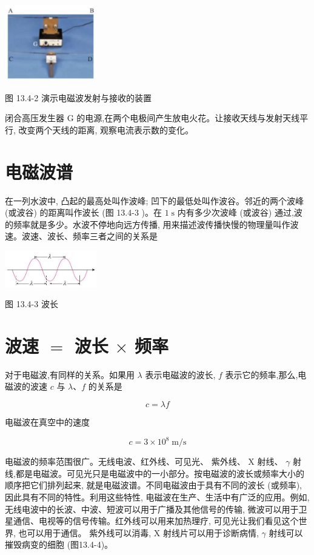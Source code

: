 \documentclass[10pt]{article}
\begin{document}
\begin{center}
\includegraphics[max width=0.3\textwidth]{images/01911d5f-8e38-70c0-b5b8-2b399bd115b6_125_777993.jpg}
\end{center}

图 13.4-2 演示电磁波发射与接收的装置

闭合高压发生器 \(\mathrm{G}\) 的电源,在两个电极间产生放电火花。让接收天线与发射天线平行, 改变两个天线的距离, 观察电流表示数的变化。

\section*{电磁波谱}

在一列水波中, 凸起的最高处叫作波峰; 凹下的最低处叫作波谷。邻近的两个波峰 (或波谷) 的距离叫作波长 (图 13.4-3 )。在 \(1\mathrm{\;s}\) 内有多少次波峰 (或波谷) 通过,波的频率就是多少。水波不停地向远方传播, 用来描述波传播快慢的物理量叫作波速。波速、波长、频率三者之间的关系是

\begin{center}
\includegraphics[max width=0.3\textwidth]{images/01911d5f-8e38-70c0-b5b8-2b399bd115b6_126_530533.jpg}
\end{center}

图 13.4-3 波长

\section*{波速 \(=\) 波长 \(\times\) 频率}

对于电磁波,有同样的关系。如果用 \(\lambda\) 表示电磁波的波长, \(f\) 表示它的频率,那么,电磁波的波速 \(c\) 与 \(\lambda \text{、}f\) 的关系是

\[
c = {\lambda f}
\]

电磁波在真空中的速度

\[
c = 3 \times {10}^{8}\mathrm{\;m}/\mathrm{s}
\]

电磁波的频率范围很广。无线电波、红外线、可见光、 紫外线、 \(\mathrm{X}\) 射线、 \(\gamma\) 射线,都是电磁波。可见光只是电磁波中的一小部分。按电磁波的波长或频率大小的顺序把它们排列起来, 就是电磁波谱。不同电磁波由于具有不同的波长 (或频率), 因此具有不同的特性。利用这些特性, 电磁波在生产、生活中有广泛的应用。例如, 无线电波中的长波、中波、短波可以用于广播及其他信号的传输, 微波可以用于卫星通信、电视等的信号传输。红外线可以用来加热理疗, 可见光让我们看见这个世界, 也可以用于通信。 紫外线可以消毒, \(\mathrm{X}\) 射线片可以用于诊断病情, \(\gamma\) 射线可以摧毁病变的细胞 (图13.4-4)。
\end{document}
